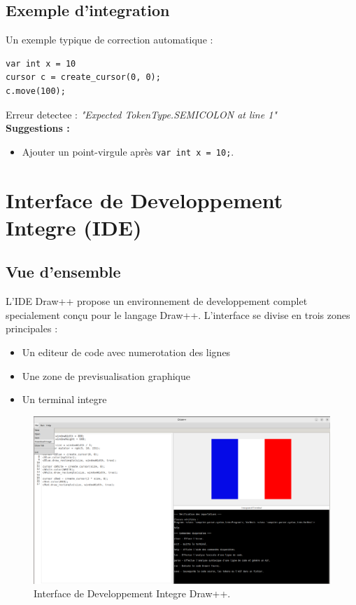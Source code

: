 \documentclass[12pt,a4paper]{report}
\begin{document}
\section{Exemple d'integration}

Un exemple typique de correction automatique :
\begin{lstlisting}[language=draw++]
var int x = 10
cursor c = create_cursor(0, 0);
c.move(100);
\end{lstlisting}

Erreur detectee : \textit{"Expected TokenType.SEMICOLON at line 1"} \\
\textbf{Suggestions :}
\begin{itemize}
    \item Ajouter un point-virgule après \texttt{var int x = 10;}.
\end{itemize}

\chapter{Interface de Developpement Integre (IDE)}

\section{Vue d'ensemble}
L'IDE Draw++ propose un environnement de developpement complet specialement conçu pour le langage Draw++. L'interface se divise en trois zones principales :
\begin{itemize}
    \item Un editeur de code avec numerotation des lignes
    \item Une zone de previsualisation graphique
    \item Un terminal integre
\end{itemize}
\begin{figure}
    \centering
    \includegraphics[width=0.9\linewidth]{assets/ide/image.png}
    \caption{Interface de Developpement Integre Draw++.}
    \label{fig:enter-label}
\end{figure}
\end{document}
